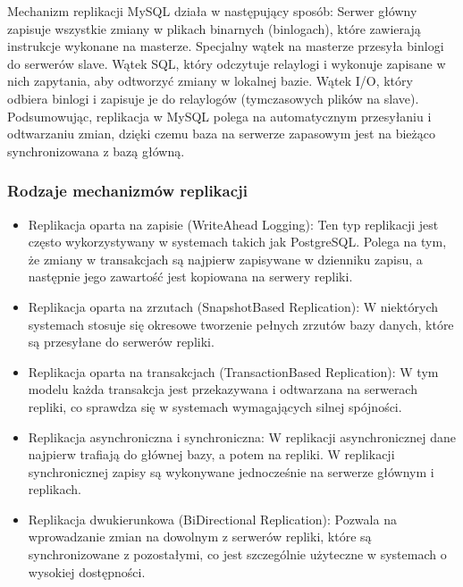 \documentclass[letterpaper,10pt,polish]{sphinxmanual}
\begin{document}
\sphinxAtStartPar
Mechanizm replikacji MySQL działa w następujący sposób:
\sphinxhyphen{} Serwer główny zapisuje wszystkie zmiany w plikach binarnych (bin\sphinxhyphen{}logach), które zawierają instrukcje wykonane na masterze.
\sphinxhyphen{} Specjalny wątek na masterze przesyła bin\sphinxhyphen{}logi do serwerów slave.
\sphinxhyphen{} Wątek SQL, który odczytuje relay\sphinxhyphen{}logi i wykonuje zapisane w nich zapytania, aby odtworzyć zmiany w lokalnej bazie.
\sphinxhyphen{} Wątek I/O, który odbiera bin\sphinxhyphen{}logi i zapisuje je do relay\sphinxhyphen{}logów (tymczasowych plików na slave).
Podsumowując, replikacja w MySQL polega na automatycznym przesyłaniu i odtwarzaniu zmian, dzięki czemu baza na serwerze zapasowym jest na bieżąco synchronizowana z bazą główną.


\subsubsection{Rodzaje mechanizmów replikacji}
\label{\detokenize{rozdzial2/Wydajnosc_Skalowanie_i_Replikacja/index:rodzaje-mechanizmow-replikacji}}\begin{itemize}
\item {} 
\sphinxAtStartPar
Replikacja oparta na zapisie (Write\sphinxhyphen{}Ahead Logging): Ten typ replikacji jest często wykorzystywany w systemach takich jak PostgreSQL. Polega na tym, że zmiany w transakcjach są najpierw zapisywane w dzienniku zapisu, a następnie jego zawartość jest kopiowana na serwery repliki.

\item {} 
\sphinxAtStartPar
Replikacja oparta na zrzutach (Snapshot\sphinxhyphen{}Based Replication): W niektórych systemach stosuje się okresowe tworzenie pełnych zrzutów bazy danych, które są przesyłane do serwerów repliki.

\item {} 
\sphinxAtStartPar
Replikacja oparta na transakcjach (Transaction\sphinxhyphen{}Based Replication): W tym modelu każda transakcja jest przekazywana i odtwarzana na serwerach repliki, co sprawdza się w systemach wymagających silnej spójności.

\item {} 
\sphinxAtStartPar
Replikacja asynchroniczna i synchroniczna: W replikacji asynchronicznej dane najpierw trafiają do głównej bazy, a potem na repliki. W replikacji synchronicznej zapisy są wykonywane jednocześnie na serwerze głównym i replikach.

\item {} 
\sphinxAtStartPar
Replikacja dwukierunkowa (Bi\sphinxhyphen{}Directional Replication): Pozwala na wprowadzanie zmian na dowolnym z serwerów repliki, które są synchronizowane z pozostałymi, co jest szczególnie użyteczne w systemach o wysokiej dostępności.

\end{itemize}
\end{document}
